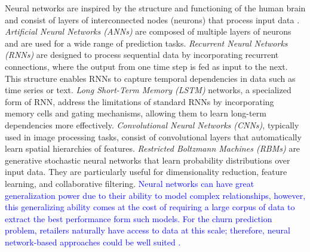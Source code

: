 Neural networks are inspired by the structure and functioning of the human brain and consist of layers of interconnected nodes (neurons) that process input data \cite{janiesch2021machine}. \textit{Artificial Neural Networks (ANNs)} are composed of multiple layers of neurons and are used for a wide range of prediction tasks. \textit{Recurrent Neural Networks (RNNs)} are designed to process sequential data by incorporating recurrent connections, where the output from one time step is fed as input to the next. This structure enables RNNs to capture temporal dependencies in data such as time series or text. \textit{Long Short-Term Memory (LSTM)} networks, a specialized form of RNN, address the limitations of standard RNNs by incorporating memory cells and gating mechanisms, allowing them to learn long-term dependencies more effectively. \textit{Convolutional Neural Networks (CNNs)}, typically used in image processing tasks, consist of convolutional layers that automatically learn spatial hierarchies of features. \textit{Restricted Boltzmann Machines (RBMs)} are generative stochastic neural networks that learn probability distributions over input data. They are particularly useful for dimensionality reduction, feature learning, and collaborative filtering. \textcolor{blue}{Neural networks can have great generalization power due to their ability to model complex relationships, however, this generalizing ability comes at the cost of requiring a large corpus of data to extract the best performance form such models. For the churn prediction problem, retailers naturally have access to data at this scale; therefore, neural network-based approaches could be well suited \cite{ajiboye2015evaluating}. }


